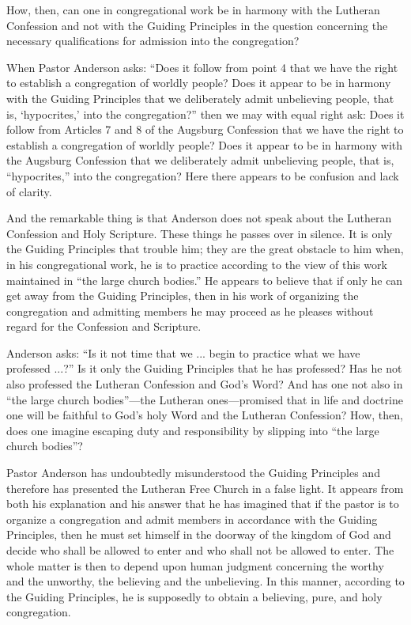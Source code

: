 How, then, can one in congregational work be in harmony with the Lutheran Confession and not with the Guiding Principles in the question concerning the necessary qualifications for admission into the congregation?

When Pastor Anderson asks: “Does it follow from point 4 that we have the right to establish a congregation of worldly people? Does it appear to be in harmony with the Guiding Principles that we deliberately admit unbelieving people, that is, ‘hypocrites,’ into the congregation?” then we may with equal right ask: Does it follow from Articles 7 and 8 of the Augsburg Confession that we have the right to establish a congregation of worldly people? Does it appear to be in harmony with the Augsburg Confession that we deliberately admit unbelieving people, that is, “hypocrites,” into the congregation? Here there appears to be confusion and lack of clarity.

And the remarkable thing is that Anderson does not speak about the Lutheran Confession and Holy Scripture. These things he passes over in silence. It is only the Guiding Principles that trouble him; they are the great obstacle to him when, in his congregational work, he is to practice according to the view of this work maintained in “the large church bodies.” He appears to believe that if only he can get away from the Guiding Principles, then in his work of organizing the congregation and admitting members he may proceed as he pleases without regard for the Confession and Scripture.

Anderson asks: “Is it not time that we ... begin to practice what we have professed ...?” Is it only the Guiding Principles that he has professed? Has he not also professed the Lutheran Confession and God’s Word? And has one not also in “the large church bodies”—the Lutheran ones—promised that in life and doctrine one will be faithful to God’s holy Word and the Lutheran Confession? How, then, does one imagine escaping duty and responsibility by slipping into “the large church bodies”?

Pastor Anderson has undoubtedly misunderstood the Guiding Principles and therefore has presented the Lutheran Free Church in a false light. It appears from both his explanation and his answer that he has imagined that if the pastor is to organize a congregation and admit members in accordance with the Guiding Principles, then he must set himself in the doorway of the kingdom of God and decide who shall be allowed to enter and who shall not be allowed to enter. The whole matter is then to depend upon human judgment concerning the worthy and the unworthy, the believing and the unbelieving. In this manner, according to the Guiding Principles, he is supposedly to obtain a believing, pure, and holy congregation.

